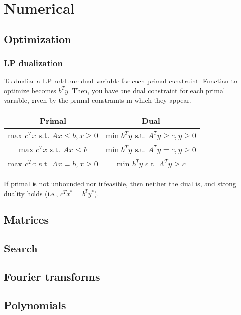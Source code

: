 \chapter{Numerical}
  
\section{Optimization}
	
	\subsection{LP dualization}
	To dualize a LP, add one dual variable for each primal 
	constraint. Function to optimize becomes $b^T y$. 
	Then, you have one dual constraint for each primal variable, 
	given by the primal constraints in which they appear. 
	\begin{center}
		\begin{tabular}{ |c|c| } 
		 \hline
		 \textbf{Primal} & \textbf{Dual} \\
		 \hline
		 max $c^T x$ s.t. $Ax \leq b, x \geq 0$ & min $b^T y$ s.t. $A^T y \geq c, y \geq 0$ \\ 
		 max $c^T x$ s.t. $Ax \leq b$ & min $b^T y$ s.t. $A^T y = c, y \geq 0$ \\ 
		 max $c^T x$ s.t. $Ax = b, x \geq 0$ & min $b^T y$ s.t. $A^T y \geq c$ \\ 
		 \hline
		\end{tabular}
	\end{center}
	If primal is not unbounded nor infeasible, then neither the
	dual is, and strong duality holds (i.e., $c^T x^* = b^T y^*$).

\section{Matrices}


\section{Search}


\section{Fourier transforms}


\section{Polynomials}

